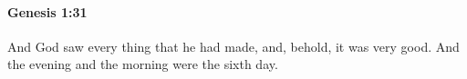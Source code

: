 
		\paragraph{Genesis 1:31} %
			\label{GENESIS-1-31}

			And God saw every thing that he had made, and, behold, it was very good. And the evening and the morning were the sixth day.

